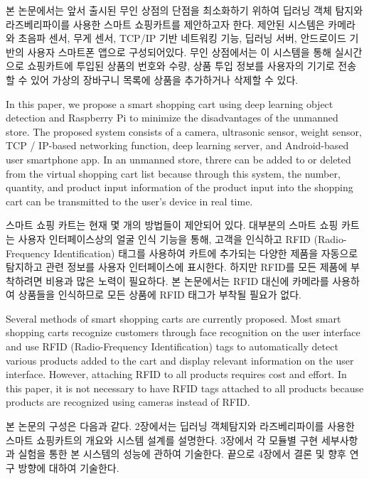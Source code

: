 \documentclass[smallextended]{svjour3}       %
\begin{document}
본 논문에서는 앞서 출시된 무인 상점의 단점을 최소화하기 위하여 딥러닝
객체 탐지와 라즈베리파이를 사용한 스마트 쇼핑카트를 제안하고자 한다.
제안된 시스템은 카메라와 초음파 센서, 무게 센서, TCP/IP 기반 네트워킹
기능, 딥러닝 서버, 안드로이드 기반의 사용자 스마트폰 앱으로
구성되어있다. 무인 상점에서는 이 시스템을 통해 실시간으로 쇼핑카트에
투입된 상품의 번호와 수량, 상품 투입 정보를 사용자의 기기로 전송할 수
있어 가상의 장바구니 목록에 상품을 추가하거나 삭제할 수 있다.

In this paper, we propose a smart shopping cart using deep learning
object detection and Raspberry Pi to minimize the disadvantages of the
unmanned store. The proposed system consists of a camera, ultrasonic
sensor, weight sensor, TCP / IP-based networking function, deep learning
server, and Android-based user smartphone app. In an unmanned store,
threre can be added to or deleted from the virtual shopping cart list
because through this system, the number, quantity, and product input
information of the product input into the shopping cart can be
transmitted to the user's device in real time.

스마트 쇼핑 카트는 현재 몇 개의 방법들이 제안되어 있다. 대부분의 스마트
쇼핑 카트는 사용자 인터페이스상의 얼굴 인식 기능을 통해, 고객을 인식하고
RFID (Radio-Frequency Identification) 태그를 사용하여 카트에 추가되는
다양한 제품을 자동으로 탐지하고 관련 정보를 사용자 인터페이스에
표시한다. 하지만 RFID를 모든 제품에 부착하려면 비용과 많은 노력이
필요하다. 본 논문에서는 RFID 대신에 카메라를 사용하여 상품들을
인식하므로 모든 상품에 RFID 태그가 부착될 필요가
없다\cite{chiang2016development, karjol2017iot}.

Several methods of smart shopping carts are currently proposed. Most
smart shopping carts recognize customers through face recognition on the
user interface and use RFID (Radio-Frequency Identification) tags to
automatically detect various products added to the cart and display
relevant information on the user interface. However, attaching RFID to
all products requires cost and effort. In this paper, it is not
necessary to have RFID tags attached to all products because products
are recognized using cameras instead of
RFID\cite{chiang2016development, karjol2017iot}.

본 논문의 구성은 다음과 같다. 2장에서는 딥러닝 객체탐지와 라즈베리파이를
사용한 스마트 쇼핑카트의 개요와 시스템 설계를 설명한다. 3장에서 각
모듈별 구현 세부사항과 실험을 통한 본 시스템의 성능에 관하여 기술한다.
끝으로 4장에서 결론 및 향후 연구 방향에 대하여 기술한다.
\end{document}
